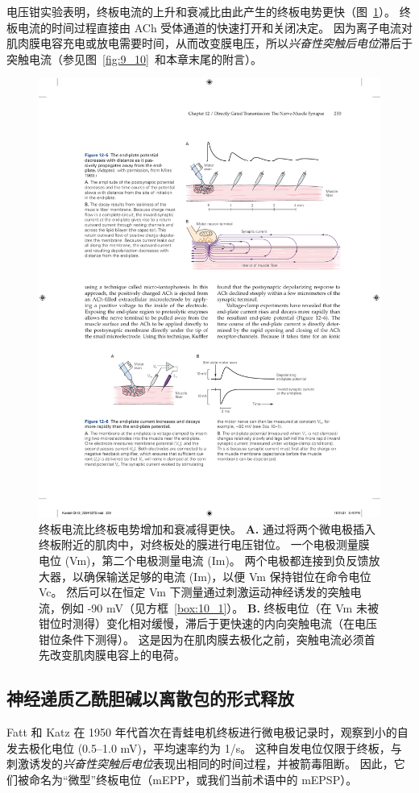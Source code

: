 电压钳实验表明，终板电流的上升和衰减比由此产生的终板电势更快（图~\ref{fig:12_6}）。
终板电流的时间过程直接由 ACh 受体通道的快速打开和关闭决定。
因为离子电流对肌肉膜电容充电或放电需要时间，从而改变膜电压，所以\textit{兴奋性突触后电位}滞后于突触电流（参见图~\ref{fig:9_10}~和本章末尾的附言）。


\begin{figure}[htbp]
	\centering
	\includegraphics[width=0.7\linewidth]{chap12/fig_12_6}
	\caption{终板电流比终板电势增加和衰减得更快。
		\textbf{A.} 通过将两个微电极插入终板附近的肌肉中，对终板处的膜进行电压钳位。
		一个电极测量膜电位 (Vm)，第二个电极测量电流 (Im)。
		两个电极都连接到负反馈放大器，以确保输送足够的电流 (Im)，以便 Vm 保持钳位在命令电位 Vc。
		然后可以在恒定 Vm 下测量通过刺激运动神经诱发的突触电流，例如 -90 mV（见方框~\ref{box:10_1}）。
		\textbf{B.} 终板电位（在 Vm 未被钳位时测得）变化相对缓慢，滞后于更快速的内向突触电流（在电压钳位条件下测得）。
		这是因为在肌肉膜去极化之前，突触电流必须首先改变肌肉膜电容上的电荷。}
	\label{fig:12_6}
\end{figure}



\subsection{神经递质乙酰胆碱以离散包的形式释放}

Fatt 和 Katz 在 1950 年代首次在青蛙电机终板进行微电极记录时，观察到小的自发去极化电位 (0.5–1.0 mV)，平均速率约为 1/s。 
这种自发电位仅限于终板，与刺激诱发的\textit{兴奋性突触后电位}表现出相同的时间过程，并被箭毒阻断。 
因此，它们被命名为“微型”终板电位（mEPP，或我们当前术语中的 mEPSP）。



